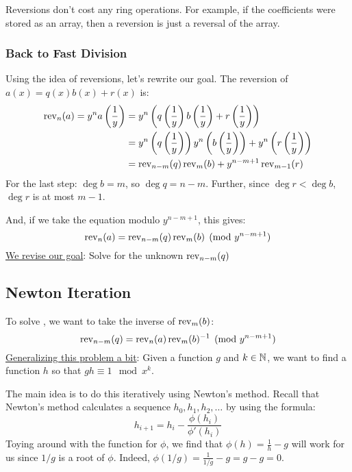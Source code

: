 \begin{note}
    Reversions don't cost any ring operations. For example, if the coefficients were stored as an array, then a reversion is just a reversal of the array. 
\end{note}

\subsubsection{Back to Fast Division}
Using the idea of reversions, let's rewrite our goal.
The reversion of $a(x) = q(x)b(x) + r(x)$ is:
\begin{align*}
    \operatorname{rev}_n(a) = y^na\left(\frac{1}{y}\right) &= y^n\left(q\left(\frac{1}{y}\right)b\left(\frac{1}{y}\right) + r\left(\frac{1}{y}\right)\right) \\
    &= y^n\left(q\left(\frac{1}{y}\right)\right)
    y^n\left(b\left(\frac{1}{y}\right)\right) + 
    y^n\left(r\left(\frac{1}{y}\right)\right) \\
    &= \operatorname{rev}_{n-m}(q)\operatorname{rev}_m(b) + y^{n-m+1}\operatorname{rev}_{m-1}(r)
\end{align*}
For the last step: $\deg b = m$, so $\deg q = n - m$.
Further, since $\deg r < \deg b$, $\deg r$ is at most $m-1$.

And, if we take the equation modulo $y^{n - m + 1}$, this gives:
\begin{equation}\label{eq:lec7-fast-division-new-goal}
    \operatorname{rev}_n(a) = \operatorname{rev}_{n-m}(q)\operatorname{rev}_m(b) \pmod{y^{n-m+1}}
\end{equation}
\ul{We revise our goal}: Solve  for the unknown $\operatorname{rev}_{n-m}(q)$

\subsection{Newton Iteration}
To solve , we want to take the inverse of $\operatorname{rev}_m(b)$:
\begin{equation}
    \operatorname{rev}_{n-m}(q) = \operatorname{rev}_n(a)\operatorname{rev}_m(b)^{-1} \pmod{y^{n-m+1}}
\end{equation}
\ul{Generalizing this problem a bit}: Given a function $g$ and $k \in \operatorname{\mathbb{N}}$, we want to find a function $h$ so that $gh \equiv 1 \mod{x^k}$.

The main idea is to do this iteratively using Newton's method.
Recall that Newton's method calculates a sequence $h_0, h_1, h_2, \ldots$ by using the formula:
\begin{equation}
    h_{i + 1} = h_i - \frac{\phi(h_i)}{\phi'(h_i)}
\end{equation}
Toying around with the function for $\phi$, we find that $\phi(h) = \frac{1}{h} - g$ will work for us since $1/g$ is a root of $\phi$.
Indeed, $\phi(1/g) = \frac{1}{1/g} - g = g - g = 0$.

